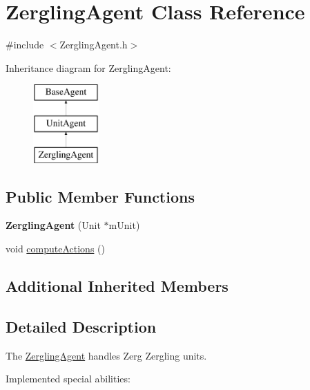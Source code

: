 \hypertarget{class_zergling_agent}{\section{Zergling\-Agent Class Reference}
\label{class_zergling_agent}
}


{\ttfamily \#include $<$Zergling\-Agent.\-h$>$}

Inheritance diagram for Zergling\-Agent\-:\begin{figure}[H]
\begin{center}
\leavevmode
\includegraphics[height=3.000000cm]{class_zergling_agent}
\end{center}
\end{figure}
\subsection*{Public Member Functions}
\begin{DoxyCompactItemize}
\item 
\hypertarget{class_zergling_agent_a1f25f8b6af664fe825ee23e5376b3940}{{\bfseries Zergling\-Agent} (Unit $\ast$m\-Unit)}\label{class_zergling_agent_a1f25f8b6af664fe825ee23e5376b3940}

\item 
void \hyperlink{class_zergling_agent_a79b5a2faf4e338b6ac2b227eef28f370}{compute\-Actions} ()
\end{DoxyCompactItemize}
\subsection*{Additional Inherited Members}


\subsection{Detailed Description}
The \hyperlink{class_zergling_agent}{Zergling\-Agent} handles Zerg Zergling units.

Implemented special abilities\-:
\begin{DoxyItemize}
\item 
\end{DoxyItemize}

